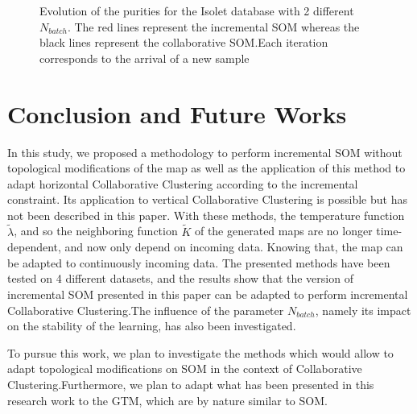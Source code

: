\begin{figure}[!h]
					\caption{Evolution of the purities for the Isolet database with 2 different $N_{batch}$. The red lines represent the incremental SOM whereas the black lines represent the collaborative SOM.\@ Each iteration corresponds to the arrival of a new sample}
				\end{figure}

	\section{Conclusion and Future Works}
\label{conclusion}
	In this study, we proposed a methodology to perform incremental SOM without topological modifications of the map as well as the application of this method to adapt horizontal Collaborative Clustering according to the incremental constraint. Its application to vertical Collaborative Clustering is possible but has not been described in this paper. With these methods, the temperature function $\widetilde{\lambda}$, and so the neighboring function $\widetilde{K}$ of the generated maps are no longer time-dependent, and now only depend on incoming data. Knowing that, the map can be adapted to continuously incoming data. The presented methods have been tested on 4 different datasets, and the results show that the version of incremental SOM presented in this paper can be adapted to perform incremental Collaborative Clustering.\@ The influence of the parameter $N_{batch}$, namely its impact on the stability of the learning, has also been investigated.
	
	To pursue this work, we plan to investigate the methods which would allow to adapt topological modifications on SOM in the context of Collaborative Clustering.\@ Furthermore, we plan to adapt what has been presented in this research work to the GTM, which are by nature similar to SOM.\@
